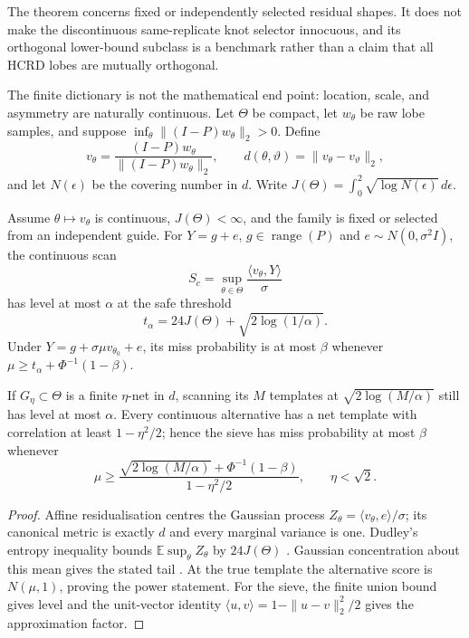 The theorem concerns fixed or independently selected residual shapes.  It does
not make the discontinuous same-replicate knot selector innocuous, and its
orthogonal lower-bound subclass is a benchmark rather than a claim that all
HCRD lobes are mutually orthogonal.

The finite dictionary is not the mathematical end point: location, scale, and
asymmetry are naturally continuous.  Let $\Theta$ be compact, let $w_\theta$
be raw lobe samples, and suppose
$\inf_\theta\|(I-P)w_\theta\|_2>0$.  Define
\begin{equation}
 v_\theta=\frac{(I-P)w_\theta}{\|(I-P)w_\theta\|_2},\qquad
 d(\theta,\vartheta)=\|v_\theta-v_\vartheta\|_2,
\end{equation}
and let $N(\epsilon)$ be the covering number in $d$.  Write
$J(\Theta)=\int_0^2\sqrt{\log N(\epsilon)}\,d\epsilon$.

\begin{theorem}
\label{thm:continuous-scan}
Assume $\theta\mapsto v_\theta$ is continuous,
$J(\Theta)<\infty$, and the family is fixed or selected from an independent
guide.  For $Y=g+e$, $g\in\operatorname{range}(P)$ and
$e\sim N(0,\sigma^2I)$, the continuous scan
\begin{equation}
 S_c=\sup_{\theta\in\Theta}\frac{\langle v_\theta,Y\rangle}{\sigma}
\end{equation}
has level at most $\alpha$ at the safe threshold
\begin{equation}
 t_\alpha=24J(\Theta)+\sqrt{2\log(1/\alpha)}.
\end{equation}
Under $Y=g+\sigma\mu v_{\theta_0}+e$, its miss probability is at most
$\beta$ whenever
$\mu\ge t_\alpha+\Phi^{-1}(1-\beta)$.

If $G_\eta\subset\Theta$ is a finite $\eta$-net in $d$, scanning its $M$
templates at $\sqrt{2\log(M/\alpha)}$ still has level at most $\alpha$.
Every continuous alternative has a net template with correlation at least
$1-\eta^2/2$; hence the sieve has miss probability at most $\beta$ whenever
\begin{equation}
 \mu\ge\frac{\sqrt{2\log(M/\alpha)}+\Phi^{-1}(1-\beta)}
 {1-\eta^2/2},\qquad \eta<\sqrt2.
\end{equation}
\end{theorem}
\begin{proof}
Affine residualisation centres the Gaussian process
$Z_\theta=\langle v_\theta,e\rangle/\sigma$; its canonical metric is exactly
$d$ and every marginal variance is one.  Dudley's entropy inequality bounds
$\mathbb E\sup_\theta Z_\theta$ by $24J(\Theta)$
\citep{dudley1967sizes}.  Gaussian concentration about this mean gives the
stated tail
\citep{tsirelson1976norms}.  At the true template the alternative score is
$N(\mu,1)$, proving the power statement.  For the sieve, the finite union
bound gives level and the unit-vector identity
$\langle u,v\rangle=1-\|u-v\|_2^2/2$ gives the approximation factor.
\end{proof}

